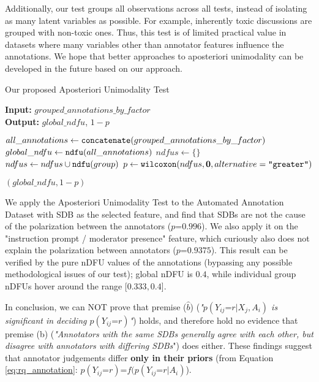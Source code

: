 Additionally, our test groups all observations across all tests, instead of isolating as many latent variables as possible. For example, inherently toxic discussions are grouped with non-toxic ones. Thus, this test is of limited practical value in datasets where many variables other than annotator features influence the annotations. We hope that better approaches to aposteriori unimodality can be developed in the future based on our approach.

\begin{algorithm}
	\caption{Our proposed Aposteriori Unimodality Test}
	\label{al:aposteriori_unimodality}
	\hspace*{\algorithmicindent} \textbf{Input:} $grouped\_annotations\_by\_factor$  \\
	\hspace*{\algorithmicindent} \textbf{Output:} $global\_ndfu$, $1 - p$ 
	\begin{algorithmic}[1]
		\State $all\_annotations \gets \texttt{concatenate}(grouped\_annotations\_by\_factor)$ 
		\State $global\_ndfu \gets \texttt{ndfu}(all\_annotations)$ 
		\State
		\State $ndfus \gets \{\}$
		\State $ndfus \gets  ndfus \cup \texttt{ndfu}(group)$ 
		\EndFor
		\State
		\State $p \gets \texttt{wilcoxon}(ndfus, \mathbf{0}, alternative=\texttt{"greater"})$
		
		\State \Return $(global\_ndfu, 1 - p)$
	\end{algorithmic}
\end{algorithm}

We apply the Aposteriori Unimodality Test to the Automated Annotation Dataset with \ac{SDB} as the selected feature, and find that \acp{SDB} are not the cause of the polarization between the annotators ($p\text{=}0.996$). We also apply it on the "instruction prompt / moderator presence" feature, which curiously also does not explain the polarization between annotators ($p\text{=}0.9375$). This result can be verified by the pure \ac{nDFU} values of the annotations (bypassing any possible methodological issues of our test); global \ac{nDFU} is $0.4$, while individual group \acp{nDFU} hover around the range [$0.333, 0.4$]. 

In conclusion, we can NOT prove that premise ($\hat{b}$) (\textit{"$p(Y_{ij} \text{=} r | X_j, A_i)$ is significant in deciding $p(Y_{ij} \text{=} r)$"}) holds, and therefore hold no evidence that premise (b) (\textit{"Annotators with the same \acp{SDB} generally agree with each other, but disagree with annotators with differing \acp{SDB}}") does either. These findings suggest that annotator judgements differ \textbf{only in their priors} (from Equation \ref{eq:rq_annotation}: $p(Y_{ij} \text{=} r) \text{=} f(p(Y_{ij} \text{=} r | A_i)$). 

